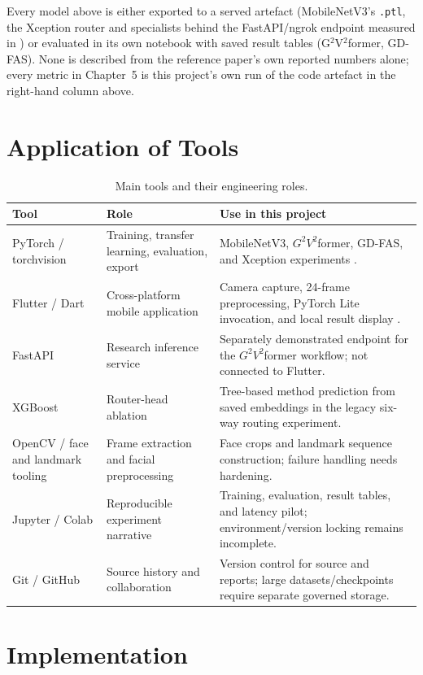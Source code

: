 Every model above is either exported to a served artefact (MobileNetV3's
\texttt{.ptl}, the Xception router and specialists behind the FastAPI/ngrok
endpoint measured in ) or evaluated in its own notebook with
saved result tables (G$^2$V$^2$former, GD-FAS). None is described from the
reference paper's own reported numbers alone; every metric in Chapter~5 is
this project's own run of the code artefact in the right-hand column above.

\section{Application of Tools}

\begin{table}[H]
\centering
\caption{Main tools and their engineering roles.}
\label{tab:tools}
\begin{tabularx}{\textwidth}{@{}p{32mm}Y Y@{}}
\toprule
Tool & Role & Use in this project \\
\midrule
PyTorch / torchvision & Training, transfer learning, evaluation, export &
MobileNetV3, $G^2V^2$former, GD-FAS, and Xception experiments \cite{pytorch}. \\
Flutter / Dart & Cross-platform mobile application & Camera capture, 24-frame
preprocessing, PyTorch Lite invocation, and local result display \cite{flutter}. \\
FastAPI & Research inference service & Separately demonstrated endpoint for the
$G^2V^2$former workflow; not connected to Flutter. \\
XGBoost & Router-head ablation & Tree-based method prediction from saved
embeddings in the legacy six-way routing experiment. \\
OpenCV / face and landmark tooling & Frame extraction and facial preprocessing &
Face crops and landmark sequence construction; failure handling needs hardening. \\
Jupyter / Colab & Reproducible experiment narrative & Training, evaluation,
result tables, and latency pilot; environment/version locking remains incomplete. \\
Git / GitHub & Source history and collaboration & Version control for source and
reports; large datasets/checkpoints require separate governed storage. \\
\bottomrule
\end{tabularx}
\end{table}

\section{Implementation}

